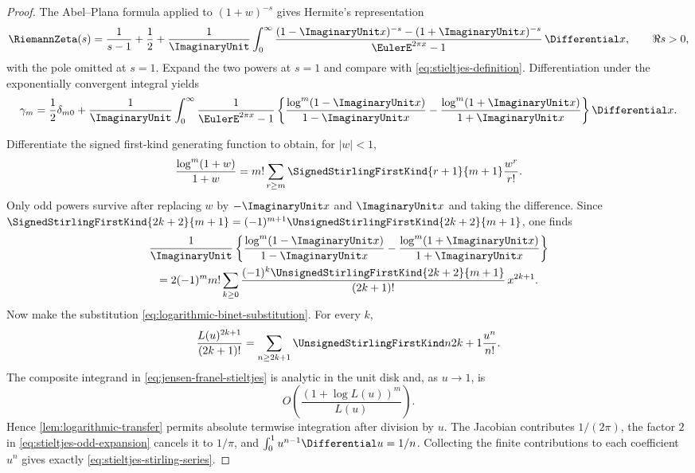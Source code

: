 \documentclass[11pt,a4paper,oneside,openany]{book}
\theoremstyle{definition}
\theoremstyle{remark}
\begin{document}
\begin{proof}
The Abel--Plana formula applied to $(1+w)^{-s}$ gives Hermite's representation
\begin{equation}
\label{eq:hermite-zeta}
 \RiemannZeta(s)=\frac1{s-1}+\frac12+\frac1{\ImaginaryUnit}\int_0^\infty
 \frac{(1-\ImaginaryUnit x)^{-s}-(1+\ImaginaryUnit x)^{-s}}{\EulerE^{2\pi x}-1}\,\Differential x,
 \qquad \Re s>0,
\end{equation}
with the pole omitted at $s=1$.  Expand the two powers at $s=1$ and compare with
\eqref{eq:stieltjes-definition}.  Differentiation under the exponentially
convergent integral yields
\begin{equation}
\label{eq:jensen-franel-stieltjes}
 \gamma_m=\frac12\delta_{m0}+\frac1{\ImaginaryUnit}\int_0^\infty\frac1{\EulerE^{2\pi x}-1}
 \left\{
 \frac{\log^m(1-\ImaginaryUnit x)}{1-\ImaginaryUnit x}
 -\frac{\log^m(1+\ImaginaryUnit x)}{1+\ImaginaryUnit x}
 \right\}\Differential x.
\end{equation}

Differentiate the signed first-kind generating function to obtain, for $|w|<1$,
\begin{equation}
\label{eq:log-power-over-linear}
 \frac{\log^m(1+w)}{1+w}
 =m!\sum_{r\ge m}\SignedStirlingFirstKind{r+1}{m+1}\frac{w^r}{r!}.
\end{equation}
Only odd powers survive after replacing $w$ by $-\ImaginaryUnit x$ and $\ImaginaryUnit x$ and taking the
difference.  Since
$\SignedStirlingFirstKind{2k+2}{m+1}=(-1)^{m+1}\UnsignedStirlingFirstKind{2k+2}{m+1}$, one finds
\begin{multline}
\label{eq:stieltjes-odd-expansion}
 \frac1{\ImaginaryUnit}\left\{
 \frac{\log^m(1-\ImaginaryUnit x)}{1-\ImaginaryUnit x}
 -\frac{\log^m(1+\ImaginaryUnit x)}{1+\ImaginaryUnit x}
 \right\}\\
 =2(-1)^m m!\sum_{k\ge0}
 \frac{(-1)^k\UnsignedStirlingFirstKind{2k+2}{m+1}}{(2k+1)!}\,x^{2k+1}.
\end{multline}
Now make the substitution \eqref{eq:logarithmic-binet-substitution}.  For every
$k$,
\[
 \frac{L(u)^{2k+1}}{(2k+1)!}
 =\sum_{n\ge2k+1}\UnsignedStirlingFirstKind n{2k+1}\frac{u^n}{n!}.
\]
The composite integrand in \eqref{eq:jensen-franel-stieltjes} is analytic in the
unit disk and, as $u\to1$, is
\[
 O\!\left(\frac{(1+\log L(u))^m}{L(u)}\right).
\]
Hence \cref{lem:logarithmic-transfer} permits absolute termwise integration after
division by $u$.  The Jacobian contributes $1/(2\pi)$, the factor $2$ in
\eqref{eq:stieltjes-odd-expansion} cancels it to $1/\pi$, and
$\int_0^1u^{n-1}\Differential u=1/n$.  Collecting the finite contributions to each
coefficient $u^n$ gives exactly \eqref{eq:stieltjes-stirling-series}.
\end{proof}
\end{document}
